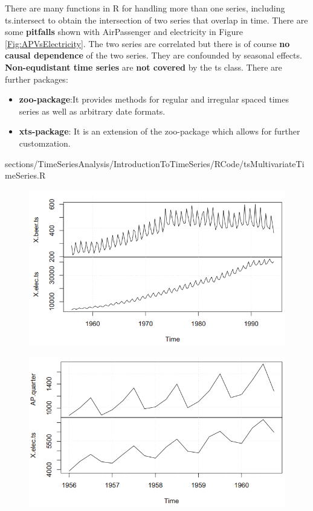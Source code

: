 {{{\hfill
\break
There are many functions in {\color{blue}R} for
handling more than one series, including {\color{blue}ts.intersect} to obtain the intersection
of two series that overlap in time. There are some \textbf{pitfalls} shown with AirPassenger and electricity in Figure \ref{Fig:APVsElectricity}. \vfill
\hfill
\break
The two series are correlated but there is of course \textbf{no causal dependence} of the two series. They are confounded by seasonal effects.
\vfill
\hfill
\break
\textbf{Non-equdistant time series} are \textbf{not covered} by the {\color{blue}ts} class. There are further packages:
\begin{itemize}
	\item \textbf{{\color{blue}zoo-}package}:It provides methods for regular and irregular spaced times series as well as arbitrary date formats.
	\item \textbf{{\color{blue}xts-}package}: It is an extension of the {\color{blue}zoo-}package which allows for further customzation.
\end{itemize}
}
{sections/TimeSeriesAnalysis/IntroductionToTimeSeries/RCode/tsMultivariateTimeSeries.R}
\begin{figure}[H]\centering
		\begin{minipage}[t]{.5\textwidth}
		\includegraphics[width=1\linewidth]{images/tsBeerVsElec.png}
		\label{Fig:BeerVsElectricity}
	\end{minipage}\hfill
	\begin{minipage}[t]{.5\textwidth}
		\includegraphics[width=1\linewidth]{images/tsAPVsElec.png}

\end{minipage}
\end{figure}}}
